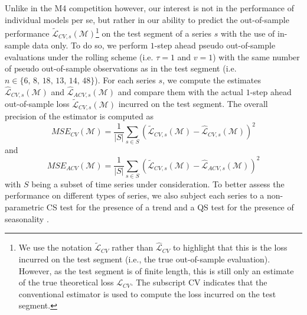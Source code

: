 \documentclass[11pt,dvipsnames]{article}
\begin{document}
Unlike in the M4 competition however, our interest is not in the performance of individual models per se, but rather in our ability to predict the out-of-sample performance $ \widetilde{\mathcal{L}}_{CV,s}(\mathcal{M}) $\footnote{We use the notation $ \widetilde{\mathcal{L}}_{CV} $ rather than $ \widehat{\mathcal{L}}_{CV} $ to highlight that this is the loss incurred on the test segment (i.e., the true out-of-sample evaluation). However, as the test segment is of finite length, this is still only an estimate of the true theoretical loss $ \mathcal{L}_{CV} $. The subscript CV indicates that the conventional estimator is used to compute the loss incurred on the test segment.} on the test segment of a series $ s $ with the use of in-sample data only. To do so, we perform $ 1 $-step ahead pseudo out-of-sample evaluations under the rolling scheme (i.e. $ \tau = 1 $ and $ v=1 $) with the same number of pseudo out-of-sample observations as in the test segment (i.e. $ n \in \lbrace 6,\,8,\,18,\,13,\,14,\,48 \rbrace$). For each series $ s $, we compute the estimates  $ \widehat{\mathcal{L}}_{CV,s}(\mathcal{M}) $ and $ \widehat{\mathcal{L}}_{ACV,s}(\mathcal{M}) $ and compare them with the actual $ 1 $-step ahead out-of-sample loss $ \widetilde{\mathcal{L}}_{CV,s}(\mathcal{M}) $ incurred on the test segment. The overall precision of the estimator is computed as 
\begin{equation}
MSE_{CV}(\mathcal{M})=\dfrac{1}{|S|}\sum_{s \in S}\left( \widetilde{\mathcal{L}}_{CV,s}(\mathcal{M}) - \widehat{\mathcal{L}}_{CV,s}(\mathcal{M}) \right) ^{2}
\end{equation}
and
\begin{equation}
MSE_{ACV}(\mathcal{M})=\dfrac{1}{|S|}\sum_{s \in S}\left( \widetilde{\mathcal{L}}_{CV,s}(\mathcal{M}) - \widehat{\mathcal{L}}_{ACV,s}(\mathcal{M}) \right) ^{2}
\end{equation}
with $ S $ being a subset of time series under consideration. To better assess the performance on different types of series, we also subject each series to a non-parametric CS test for the presence of a trend \citep{coxQuickSignTests1955} and a QS test for the presence of seasonality \citep{ljungMeasureLackFit1978}. 
\end{document}
